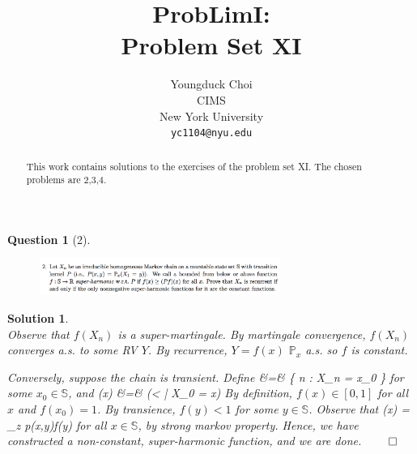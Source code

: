 \documentclass{article} %
\title{ProbLimI: \\
Problem Set XI}
\author{
Youngduck Choi \\
CIMS \\
New York University\\
\texttt{yc1104@nyu.edu} \\
}
\def\eQb#1\eQe{\begin{eqnarray*}#1\end{eqnarray*}}
\theoremstyle{quest}
\newtheorem*{question}{Question}
\newtheorem*{solution}{Solution}
\begin{document}
\maketitle

\begin{abstract}
This work contains solutions to the exercises of the problem set XI. The
chosen problems are 2,3,4.
\end{abstract}

\bigskip

\begin{question}[2]
\hfill
\begin{figure}[h!]
  \centering
    \includegraphics[width=0.7\textwidth]{prob-e11-p1.png}
\end{figure}
\end{question}
\begin{solution} \hfill \\
Observe that $f(X_n)$ is a super-martingale.
By martingale convergence, $f(X_n)$ converges a.s. to some RV $Y$. By 
recurrence, $Y = f(x)$ $\mathbb{P}_x$ a.s. so $f$ is constant.

Conversely, suppose the chain is transient. Define
\eQb
\tau &=& \inf\{ n  : X_n = x_0 \}
\eQe
for some $x_0 \in \mathbb{S}$, and
\eQb
f(x) &=& (\tau < \infty \> | \> X_0 = x)
\eQe
By definition, $f(x) \in [0,1]$ for all $x$ and $f(x_0) = 1$.
By transience, $f(y) < 1$ for some $y \in \mathbb{S}$.
Observe that
\eQb
f(x) = \sum_{z \in {}} p(x,y)f(y)
\eQe
for all $x \in \mathbb{S}$, by strong markov property.
Hence, we have constructed a non-constant, super-harmonic function, and we are done.
\hfill $\qed$
 
\end{solution}

\newpage
\end{document}
